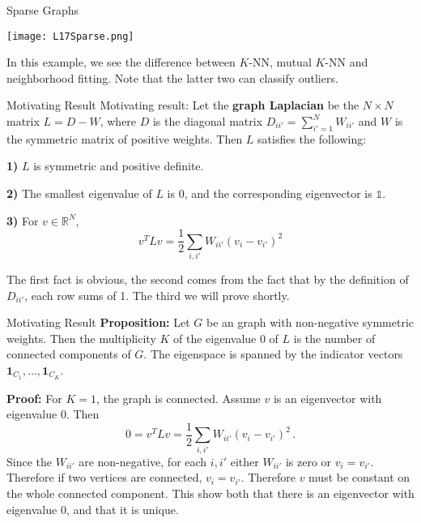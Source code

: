 \documentclass[10pt, table, dvipsnames,xcdraw, handout]{beamer}
\begin{document}
\begin{frame}[fragile]{Sparse Graphs}
  \begin{minipage}[t][0.7\textheight][t]{\textwidth}
	\centering \texttt{[image: L17Sparse.png]}
  \end{minipage}
  \vfill
\begin{minipage}[t][0.3\textheight][t]{\textwidth}
In this example, we see the difference between $K$-NN, mutual $K$-NN and neighborhood fitting. Note that the latter two can classify outliers. 
\end{minipage}
\end{frame}

\begin{frame}[fragile]{Motivating Result}
Motivating result: Let the \textbf{graph Laplacian} be the $N\times N$ matrix $L = D-W$, where $D$ is the diagonal matrix $D_{ii'} = \sum_{i'=1}^N W_{ii'}$ and $W$ is the symmetric matrix of positive weights. Then $L$ satisfies the following:

\textbf{1)} $L$ is symmetric and positive definite.

\textbf{2)} The smallest eigenvalue of $L$ is 0, and the corresponding eigenvector is $\mathbb{1}$. 

\textbf{3)} For $v\in \mathbb{R}^N$,
$$
v^TLv = \frac12 \sum_{i,i'} W_{ii'}(v_i-v_{i'})^2
$$


The first fact is obvious, the second comes from the fact that by the definition of $D_{ii'}$, each row sums of 1. The third we will prove shortly. 

\end{frame}



\begin{frame}[fragile]{Motivating Result}
\textbf{Proposition:} Let $G$ be an graph with non-negative symmetric weights. Then the multiplicity $K$ of the eigenvalue 0 of $L$ is the number of connected components of $G$. The eigenspace is spanned by the indicator vectors $\mathbf{1}_{C_1},\ldots, \mathbf{1}_{C_{K}}$.\pause


\textbf{Proof:} For $K=1$, the graph is connected. Assume $v$ is an eigenvector with eigenvalue 0. Then 
$$
0 = v^TLv = \frac12 \sum_{i,i'} W_{ii'}(v_i-v_{i'})^2\,.
$$
Since the $W_{ii'}$ are non-negative, for each $i,i'$ either $W_{ii'}$ is zero or $v_i = v_{i'}$. Therefore if two vertices are connected, $v_i = v_{i'}$. Therefore $v$ must be constant on the whole connected component. This show both that there is an eigenvector with eigenvalue 0, and that it is unique. 
\end{frame}
\end{document}
